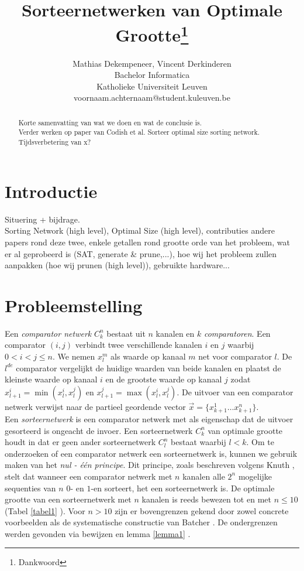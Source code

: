 \documentclass{article}
\title{Sorteernetwerken van Optimale Grootte\thanks{Dankwoord}}
\author{Mathias Dekempeneer, Vincent Derkinderen \\
Bachelor Informatica\\
Katholieke Universiteit Leuven \\
{voornaam.achternaam}@student.kuleuven.be}
\begin{document}
\maketitle

\begin{abstract}
Korte samenvatting van wat we doen en wat de conclusie is.\\
Verder werken op paper van Codish et al. Sorteer optimal size sorting network.\\
Tijdsverbetering van x?
\end{abstract}

\section{Introductie}

Situering + bijdrage.\\
Sorting Network (high level), Optimal Size (high level), contributies andere papers rond deze twee, enkele getallen rond grootte orde van het probleem, wat er al geprobeerd is (SAT, generate \& prune,...), hoe wij het probleem zullen aanpakken (hoe wij prunen (high level)), gebruikte hardware...

\section{Probleemstelling}
Een \textit{comparator netwerk} $C^n_k$ bestaat uit $n$ kanalen en $k$ \textit{comparatoren}. Een comparator $\left(i, j\right)$ verbindt twee verschillende kanalen $i$ en $j$ waarbij $0 < i < j \leq n$.
We nemen $x_l^m$ als waarde op kanaal $m$ net voor comparator $l$.
De $l^{de}$ comparator  vergelijkt de huidige waarden van beide kanalen en plaatst de kleinste waarde op kanaal $i$ en de grootste waarde op kanaal $j$ zodat $x_{l+1}^i = \min(x_l^i,x_l^j)$ en $x_{l+1}^j = \max(x_l^i,x_l^j)$. De uitvoer van een comparator netwerk verwijst naar de partieel geordende vector $\vec{x} = \{x^1_{k+1} \dots x^n_{k+1} \} $.\\ %
Een \textit{sorteernetwerk} is een comparator netwerk met als eigenschap dat de uitvoer gesorteerd is ongeacht de invoer.
Een sorteernetwerk $C^n_k$ van optimale grootte houdt in dat er geen ander sorteernetwerk $C^n_l$ bestaat waarbij $l < k$. %
Om te onderzoeken of een comparator netwerk een sorteernetwerk is, kunnen we gebruik maken van het \textit{nul - \'e\'en principe}. Dit principe, zoals beschreven volgens Knuth \cite{Knuth3}, stelt dat wanneer een comparator netwerk met $n$ kanalen alle $2^n$ mogelijke sequenties van $n$ $0$- en $1$-en sorteert, het een sorteernetwerk is.
De optimale grootte van een sorteernetwerk met $n$ kanalen is reeds bewezen tot en met $n \leq 10$ (Tabel \ref{tabel1} \cite{sortingNetworksSize2014}). Voor $n > 10$ zijn er bovengrenzen gekend door zowel concrete voorbeelden als de systematische constructie van Batcher \cite{sortingNetworksApplications}. De ondergrenzen werden gevonden via bewijzen en lemma \ref{lemma1} \cite{Voorhis1972}.
\end{document}

